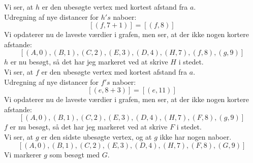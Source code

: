 \documentclass[a4paper,12pt]{article}
\begin{document}
Vi ser, at $h$ er den ubesøgte vertex med kortest afstand fra $a$.\\
Udregning af nye distancer for $h's$ naboer:
\[
[(f,7+1)] = [(f,8)]
\]
Vi opdaterer nu de laveste værdier i grafen, men ser, at der ikke nogen kortere afstande:
\[
[(A,0),(B,1),(C,2),(E,3),(D,4),(H,7),(f,8),(g,9)]
\]
$h$ er nu besøgt, så det har jeg markeret ved at skrive $H$ i stedet.\\

Vi ser, at $f$ er den ubesøgte vertex med kortest afstand fra $a$.\\
Udregning af nye distancer for $f's$ naboer:
\[
[(e,8+3)] = [(e,11)]
\]
Vi opdaterer nu de laveste værdier i grafen, men ser, at der ikke nogen kortere afstande:
\[
[(A,0),(B,1),(C,2),(E,3),(D,4),(H,7),(F,8),(g,9)]
\]
$f$ er nu besøgt, så det har jeg markeret ved at skrive $F$ i stedet.\\

Vi ser, at $g$ er den sidste ubesøgte vertex, og at $g$ ikke har nogen naboer.\\
\[
[(A,0),(B,1),(C,2),(E,3),(D,4),(H,7),(F,8),(G,9)]
\]
Vi markerer $g$ som besøgt med $G$.

\subsection[]{}



\subsection[]{}



\subsection[]{}
\end{document}
